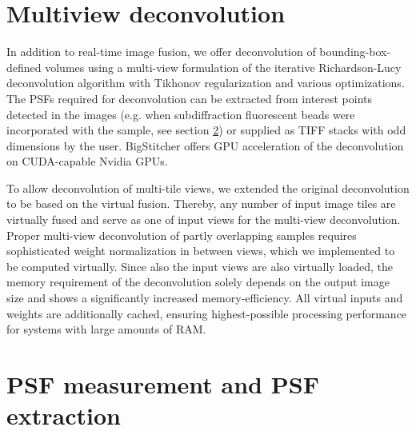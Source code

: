 \section{Multiview deconvolution}
\label{sec:mvdecon}

In addition to real-time image fusion, we offer deconvolution of bounding-box-defined volumes using a multi-view formulation of the iterative Richardson-Lucy deconvolution algorithm\cite{richardson, lucy} with Tikhonov regularization\cite{Tikhonov/Arsenin/77} and various optimizations\cite{mvdecon}. The PSFs required for deconvolution can be extracted from interest points detected in the images (e.g. when subdiffraction fluorescent beads were incorporated with the sample, see section \ref{sec:psf}) or supplied as TIFF stacks with odd dimensions by the user. BigStitcher offers GPU acceleration of the deconvolution on CUDA-capable Nvidia GPUs.

To allow deconvolution of multi-tile views, we extended the original deconvolution\cite{mvdecon} to be based on the virtual fusion. Thereby, any number of input image tiles are virtually fused and serve as one of input views for the multi-view deconvolution. Proper multi-view deconvolution of partly overlapping samples requires sophisticated weight normalization in between views\cite{mvdecon}, which we implemented to be computed virtually. Since also the input views are also virtually loaded, the memory requirement of the deconvolution solely depends on the output image size and shows a significantly increased memory-efficiency. All virtual inputs and weights are additionally cached, ensuring highest-possible processing performance for systems with large amounts of RAM.


\section{PSF measurement and PSF extraction}
\label{sec:psf}


